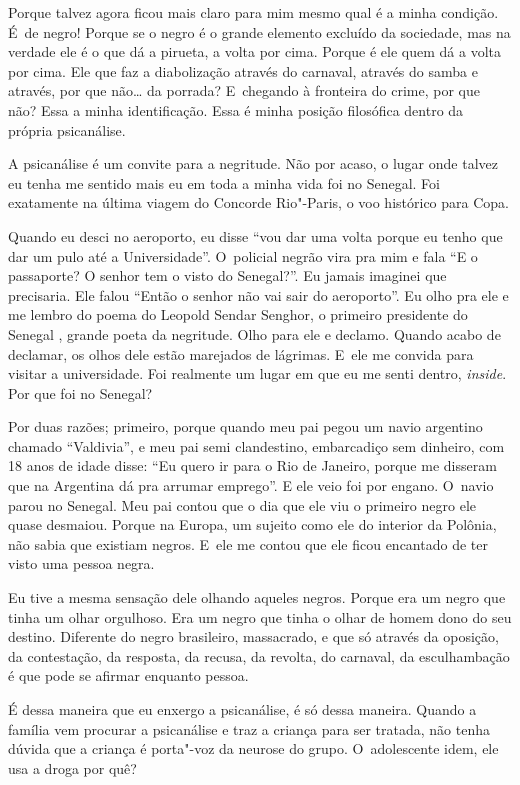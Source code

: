 Porque talvez agora ficou mais claro para mim mesmo qual é a minha
condição. É~de negro! Porque se o negro é o grande elemento excluído da
sociedade, mas na verdade ele é o que dá a pirueta, a volta por cima.
Porque é ele quem dá a volta por cima. Ele que faz a diabolização
através do carnaval, através do samba e através, por que não… da
porrada? E~chegando à fronteira do crime, por que não? Essa a minha
identificação. Essa é minha posição filosófica dentro da própria
psicanálise.

A psicanálise é um convite para a negritude. Não por acaso, o lugar onde
talvez eu tenha me sentido mais eu em toda a minha vida foi no Senegal.
Foi exatamente na última viagem do Concorde Rio"-Paris, o voo histórico
para Copa.

Quando eu desci no aeroporto, eu disse ``vou dar uma volta porque eu tenho
que dar um pulo até a Universidade''. O~policial negrão vira pra mim e
fala ``E o passaporte? O senhor tem o visto do Senegal?''. Eu jamais
imaginei que precisaria. Ele falou ``Então o senhor não vai sair do
aeroporto''. Eu olho pra ele e me lembro do poema do Leopold Sendar
Senghor, o primeiro presidente do Senegal , grande poeta da negritude.
Olho para ele e declamo. Quando acabo de declamar, os olhos dele estão
marejados de lágrimas. E~ele me convida para visitar a universidade. Foi
realmente um lugar em que eu me senti dentro, \emph{inside}. Por que foi
no Senegal?

Por duas razões; primeiro, porque quando meu pai pegou um navio
argentino chamado ``Valdivia'', e meu pai semi clandestino, embarcadiço
sem dinheiro, com 18 anos de idade disse: ``Eu quero ir para o Rio de
Janeiro, porque me disseram que na Argentina dá pra arrumar emprego''. E
ele veio foi por engano. O~navio parou no Senegal. Meu pai contou que o
dia que ele viu o primeiro negro ele quase desmaiou. Porque na Europa,
um sujeito como ele do interior da Polônia, não sabia que existiam
negros. E~ele me contou que ele ficou encantado de ter visto uma pessoa
negra.

Eu tive a mesma sensação dele olhando aqueles negros. Porque era um
negro que tinha um olhar orgulhoso. Era um negro que tinha o olhar de
homem dono do seu destino. Diferente do negro brasileiro, massacrado, e
que só através da oposição, da contestação, da resposta, da recusa, da
revolta, do carnaval, da esculhambação é que pode se afirmar enquanto
pessoa.

É dessa maneira que eu enxergo a psicanálise, é só dessa maneira. Quando
a família vem procurar a psicanálise e traz a criança para ser tratada,
não tenha dúvida que a criança é porta"-voz da neurose do grupo. O~adolescente idem, ele usa a droga por quê?

